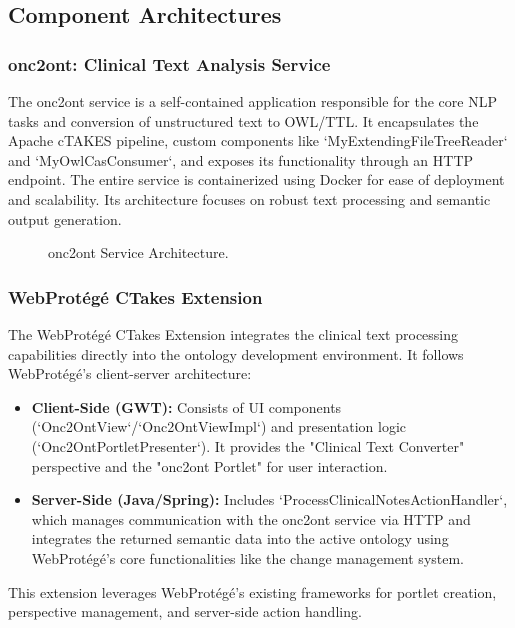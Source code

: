 \documentclass[12pt, a4paper]{article}
\begin{document}
\subsection{Component Architectures}

\subsubsection{onc2ont: Clinical Text Analysis Service}
The onc2ont service is a self-contained application responsible for the core NLP tasks and conversion of unstructured text to OWL/TTL. It encapsulates the Apache cTAKES pipeline, custom components like `MyExtendingFileTreeReader` and `MyOwlCasConsumer`, and exposes its functionality through an HTTP endpoint. The entire service is containerized using Docker for ease of deployment and scalability. Its architecture focuses on robust text processing and semantic output generation.

\begin{figure}[hh]
    \centering
    \caption{onc2ont Service Architecture.}
    \label{fig:onc2ont_architecture}
\end{figure}

\subsubsection{WebProtégé CTakes Extension}
The WebProtégé CTakes Extension integrates the clinical text processing capabilities directly into the ontology development environment. It follows WebProtégé's client-server architecture:
\begin{itemize}
    \item \textbf{Client-Side (GWT):} Consists of UI components (`Onc2OntView`/`Onc2OntViewImpl`) and presentation logic (`Onc2OntPortletPresenter`). It provides the "Clinical Text Converter" perspective and the "onc2ont Portlet" for user interaction.
    \item \textbf{Server-Side (Java/Spring):} Includes `ProcessClinicalNotesActionHandler`, which manages communication with the onc2ont service via HTTP and integrates the returned semantic data into the active ontology using WebProtégé's core functionalities like the change management system.
\end{itemize}
This extension leverages WebProtégé's existing frameworks for portlet creation, perspective management, and server-side action handling.
\end{document}
